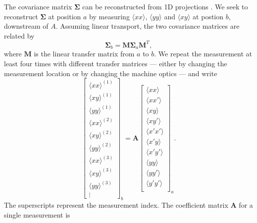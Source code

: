 The covariance matrix $\bm{\Sigma}$ can be reconstructed from 1D projections \cite{book:Minty2003, Woodley2000, Prat2014}. We seek to reconstruct $\bm{\Sigma}$ at position $a$ by measuring $\langle{xx}\rangle$, $\langle{yy}\rangle$ and $\langle{xy}\rangle$ at postion $b$, downstream of $A$. Assuming linear transport, the two covariance matrices are related by
%
\begin{equation}
    \bm{\Sigma}_b = \mathbf{M} \bm{\Sigma}_a \mathbf{M}^T,
\end{equation}
%
where $\mathbf{M}$ is the linear transfer matrix from $a$ to $b$. We repeat the measurement at least four times with different transfer matrices — either by changing the measurement location or by changing the machine optics — and write
%
\begin{equation}
    \begin{bmatrix}
        {\langle{xx}\rangle}^{(1)} \\
        {\langle{xy}\rangle}^{(1)} \\
        {\langle{yy}\rangle}^{(1)} \\
        {\langle{xx}\rangle}^{(2)} \\
        {\langle{xy}\rangle}^{(2)} \\
        {\langle{yy}\rangle}^{(2)} \\
        {\langle{xx}\rangle}^{(3)} \\
        {\langle{xy}\rangle}^{(3)} \\
        {\langle{yy}\rangle}^{(3)} \\
        \vdots
    \end{bmatrix}_b
    = \mathbf{A}
    \begin{bmatrix}
        \langle{xx}\rangle \\
        \langle{xx'}\rangle \\
        \langle{xy}\rangle \\
        \langle{xy'}\rangle \\
        \langle{x'x'}\rangle \\
        \langle{x'y}\rangle \\
        \langle{x'y'}\rangle \\
        \langle{yy}\rangle \\
        \langle{yy'}\rangle \\
        \langle{y'y'}\rangle \\
    \end{bmatrix}_a
    .
\end{equation}
%
The superscripts represent the measurement index. The coefficient matrix $\mathbf{A}$ for a single measurement is
